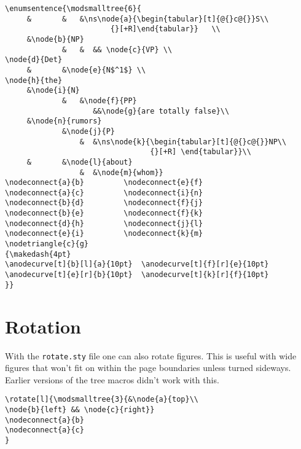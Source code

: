 \begin{verbatim}
\enumsentence{\modsmalltree{6}{
     &       &   &\ns\node{a}{\begin{tabular}[t]{@{}c@{}}S\\ 
                        {}[+R]\end{tabular}}   \\
     &\node{b}{NP} 
             &   &  && \node{c}{VP} \\
\node{d}{Det}
     &       &\node{e}{N$^1$} \\
\node{h}{the}
     &\node{i}{N}  
             &   &\node{f}{PP} 
                    &&\node{g}{are totally false}\\
     &\node{n}{rumors}
             &\node{j}{P} 
                 &  &\ns\node{k}{\begin{tabular}[t]{@{}c@{}}NP\\
                                 {}[+R] \end{tabular}}\\
     &       &\node{l}{about} 
                 &  &\node{m}{whom}}
\nodeconnect{a}{b}         \nodeconnect{e}{f}
\nodeconnect{a}{c}         \nodeconnect{i}{n}
\nodeconnect{b}{d}         \nodeconnect{f}{j}
\nodeconnect{b}{e}         \nodeconnect{f}{k}
\nodeconnect{d}{h}         \nodeconnect{j}{l}
\nodeconnect{e}{i}         \nodeconnect{k}{m}
\nodetriangle{c}{g}
{\makedash{4pt}
\anodecurve[t]{b}[l]{a}{10pt}  \anodecurve[t]{f}[r]{e}{10pt}
\anodecurve[t]{e}[r]{b}{10pt}  \anodecurve[t]{k}[r]{f}{10pt}
}}
\end{verbatim}

\section{Rotation}

With the {\tt rotate.sty} file one can also rotate figures.  This is
useful with wide figures that won't fit on within the page boundaries
unless turned sideways.  Earlier versions of the tree macros didn't
work with this.


\begin{verbatim}
\rotate[l]{\modsmalltree{3}{&\node{a}{top}\\
\node{b}{left} && \node{c}{right}}
\nodeconnect{a}{b}
\nodeconnect{a}{c}
}
\end{verbatim}

